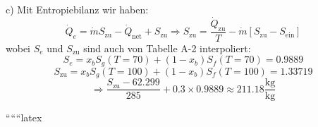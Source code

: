 c) Mit Entropiebilanz wir haben:
\[
\dot{Q}_e = \dot{m} S_{\text{zu}} - \dot{Q}_{\text{net}} + S_{\text{zu}} \Rightarrow S_{\text{zu}} = \frac{\dot{Q}_{\text{zu}}}{T} - \dot{m} [S_{\text{zu}} - S_{\text{ein}}]
\]
wobei \(S_e\) und \(S_{\text{zu}}\) sind auch von Tabelle A-2 interpoliert:
\[
S_e = x_b S_g (T = 70) + (1 - x_b) S_f (T = 70) = 0.9889
\]
\[
S_{\text{zu}} = x_b S_g (T = 100) + (1 - x_b) S_f (T = 100) = 1.33719
\]
\[
\Rightarrow \frac{S_{\text{zu}} - 62.299}{285} + 0.3 \times 0.9889 \approx 211.18 \frac{\text{kg}}{\text{kg}}
\]

``````latex